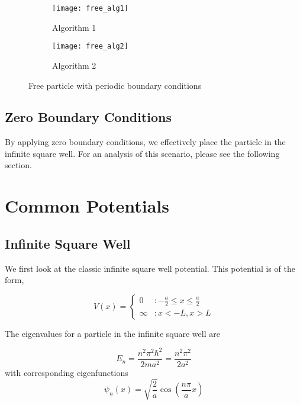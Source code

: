 \documentclass{article}
\begin{document}

\begin{figure}
\centering
\begin{subfigure}[h!]{0.3\textwidth}
\centering
\texttt{[image: free\_alg1]}
\caption{Algorithm 1}
\end{subfigure}
%
\begin{subfigure}[h!]{0.3\textwidth}
\centering
\texttt{[image: free\_alg2]}
\caption{Algorithm 2}
\end{subfigure}

\caption{Free particle with periodic boundary conditions}
\end{figure}

\subsection{Zero Boundary Conditions}

By applying zero boundary conditions, we effectively place the particle in the infinite square well. For an analysis of this scenario, please see the following section. 

\section{Common Potentials}

\subsection{Infinite Square Well}

We first look at the classic infinite square well potential. This potential is of the form,

\[V(x) = \left\{
  \begin{array}{lr}
    0 &  : -\frac{a}{2} \leq x \leq \frac{a}{2} \\
    \infty & : x < -L , x > L 
  \end{array}
\right.
\]

The eigenvalues for a particle in the infinite square well are

\begin{equation}
E_n = \frac{n^2 \pi^2 \hbar^2}{2 ma^2} = \frac{n^2 \pi ^2}{2 a^2}
\end{equation}
%
with corresponding eigenfunctions
\begin{equation}
\psi_n(x) = \sqrt{\frac{2}{a}} \cos \left( \frac{n\pi}{a} x \right)
\end{equation}
\end{document}
